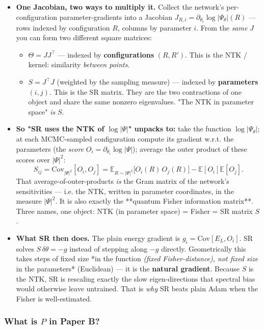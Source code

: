 \documentclass[11pt]{article}
\begin{document}
\begin{itemize}
\item \textbf{One Jacobian, two ways to multiply it.} Collect the network's
per-configuration parameter-gradients into a Jacobian
$J_{R,i} = \partial_{\theta_i}\log|\Psi_\theta|(R)$ --- rows indexed by
configuration $R$, columns by parameter $i$. From the \emph{same} $J$ you can
form two different square matrices:
\begin{itemize}
\item $\Theta = J J^\top$ --- indexed by \textbf{configurations} $(R,R')$. This is
the NTK / kernel: similarity \emph{between points}.
\item $S = J^\top J$ (weighted by the sampling measure) --- indexed by
\textbf{parameters} $(i,j)$. This is the SR matrix.
They are the two contractions of one object and share the same nonzero
eigenvalues. "The NTK in parameter space" \emph{is} $S$.
\end{itemize}
\item \textbf{So "SR uses the NTK of $\log|\Psi|$" unpacks to:} take the function
$\log|\Psi_\theta|$; at each MCMC-sampled configuration compute its
gradient w.r.t. the parameters (the \emph{score} $O_i = \partial_{\theta_i}
  \log|\Psi|$); average the outer product of these scores over $|\Psi|^2$:
\[S_{ij} = \mathrm{Cov}_{|\Psi|^2}[O_i, O_j]
            = \mathbb E_{R\sim|\Psi|^2}\!\big[O_i(R)\,O_j(R)\big]
              - \mathbb E[O_i]\mathbb E[O_j].\]
That average-of-outer-products \emph{is} the Gram matrix of the network's
sensitivities --- i.e. the NTK, written in parameter coordinates, in the
measure $|\Psi|^2$. It is also exactly the **quantum Fisher information
matrix**. Three names, one object: NTK (in parameter space) = Fisher = SR
matrix $S$.
\item \textbf{What SR then does.} The plain energy gradient is $g_i = \mathrm{Cov}
  [E_L, O_i]$. SR solves $S\,\delta\theta = -g$ instead of stepping along
$-g$ directly. Geometrically this takes steps of fixed size *in the
function\emph{ (fixed Fisher-distance), not fixed size }in the parameters*
(Euclidean) --- it is the \textbf{natural gradient}. Because $S$ is the NTK, SR
is rescaling exactly the slow eigen-directions that spectral bias would
otherwise leave untrained. That is \emph{why} SR beats plain Adam when the
Fisher is well-estimated.
\end{itemize}
\subsubsection*{What is $P$ in Paper B?}
\end{document}
